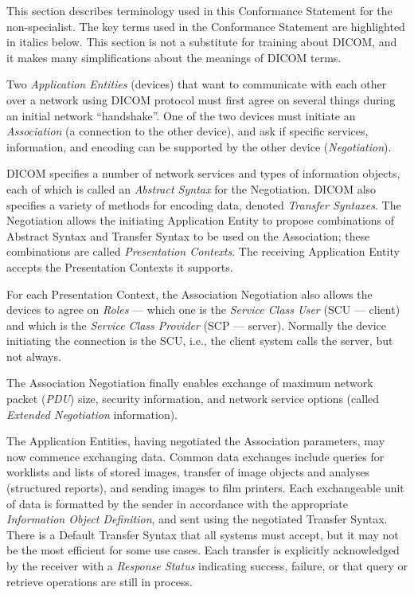 \documentclass[12pt, letterpaper]{article}
\begin{document}
This section describes terminology used in this Conformance Statement for the non-specialist.
The key terms used in the Conformance Statement are highlighted in italics below.
This section is not a substitute for training about \gls{DICOM}, and it makes many simplifications about the meanings of \gls{DICOM} terms.

Two \emph{Application Entities} (devices) that want to communicate with each other over a network using \gls{DICOM} protocol must first agree on several things during an initial network ``handshake''.
 One of the two devices must initiate an \emph{Association} (a connection to the other device), and ask if specific services, information, and encoding can be supported by the other device (\emph{Negotiation}).

\gls{DICOM} specifies a number of network services and types of information objects, each of which is called an \emph{Abstract Syntax} for the Negotiation.
\gls{DICOM} also specifies a variety of methods for encoding data, denoted \emph{Transfer Syntaxes}.
The Negotiation allows the initiating Application Entity to propose combinations of Abstract Syntax and Transfer Syntax to be used on the Association; these combinations are called \emph{Presentation Contexts}.
The receiving Application Entity accepts the Presentation Contexts it supports.

For each Presentation Context, the Association Negotiation also allows the devices to agree on \emph{Roles} --- which one is the \emph{Service Class User} (\gls{SCU} --- client) and which is the \emph{Service Class Provider} (\gls{SCP} --- server).
Normally the device initiating the connection is the \gls{SCU}, i.e., the client system calls the server, but not always.

The Association Negotiation finally enables exchange of maximum network packet (\emph{PDU}) size, security information, and network service options (called \emph{Extended Negotiation} information).

The Application Entities, having negotiated the Association parameters, may now commence exchanging data.
Common data exchanges include queries for worklists and lists of stored images, transfer of image objects and analyses (structured reports), and sending images to film printers.
Each exchangeable unit of data is formatted by the sender in accordance with the appropriate \emph{Information Object Definition}, and sent using the negotiated Transfer Syntax.
There is a Default Transfer Syntax that all systems must accept, but it may not be the most efficient for some use cases.
Each transfer is explicitly acknowledged by the receiver with a \emph{Response Status} indicating success, failure, or that query or retrieve operations are still in process.
\end{document}
